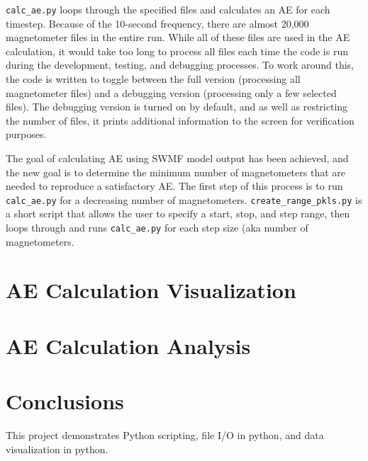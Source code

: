 \documentclass[12pt, letterpaper]{article}
\begin{document}
\texttt{calc\_ae.py} loops through the specified files and calculates an AE for each timestep. Because of the 10-second frequency, there are almost 20,000 magnetometer files in the entire run. While all of these files are used in the AE calculation, it would take too long to process all files each time the code is run during the development, testing, and debugging processes. To work around this, the code is written to toggle between the full version (processing all magnetometer files) and a debugging version (processing only a few selected files). The debugging version is turned on by default, and as well as restricting the number of files, it prints additional information to the screen for verification purposes.

The goal of calculating AE using SWMF model output has been achieved, and the new goal is to determine the minimum number of magnetometers that are needed to reproduce a satisfactory AE. The first step of this process is to run \texttt{calc\_ae.py} for a decreasing number of magnetometers. \texttt{create\_range\_pkls.py} is a short script that allows the user to specify a start, stop, and step range, then loops through and runs \texttt{calc\_ae.py} for each step size (aka number of magnetometers. 


\section{AE Calculation Visualization} \label{vis}

\section{AE Calculation Analysis} \label{anal}


\section{Conclusions} \label{conc}


This project demonstrates Python scripting, file I/O in python, and data visualization in python.

\end{document}
